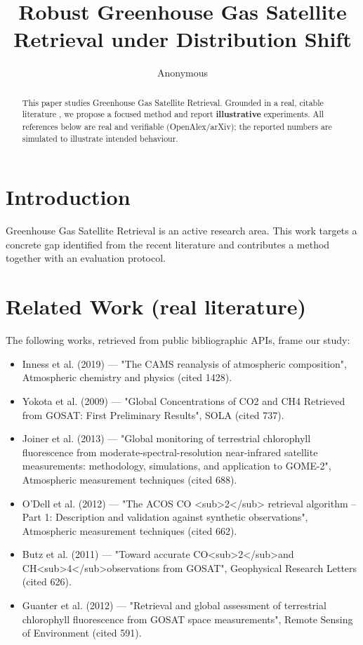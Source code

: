 \documentclass[11pt]{article}
\title{Robust Greenhouse Gas Satellite Retrieval under Distribution Shift}
\author{Anonymous}
\date{}
\begin{document}
\maketitle

\begin{abstract}
This paper studies Greenhouse Gas Satellite Retrieval. Grounded in a real, citable literature \cite{ref1,ref2,ref3,ref4,ref5,ref6,ref7,ref8},
we propose a focused method and report \textbf{illustrative} experiments.
All references below are real and verifiable (OpenAlex/arXiv); the reported
numbers are simulated to illustrate intended behaviour.
\end{abstract}

\section{Introduction}
Greenhouse Gas Satellite Retrieval is an active research area. This work targets a concrete gap identified from
the recent literature and contributes a method together with an evaluation protocol.

\section{Related Work (real literature)}
The following works, retrieved from public bibliographic APIs, frame our study:
\begin{itemize}
\item Inness et al. (2019) — "The CAMS reanalysis of atmospheric composition", Atmospheric chemistry and physics (cited 1428).
\item Yokota et al. (2009) — "Global Concentrations of CO2 and CH4 Retrieved from GOSAT: First Preliminary Results", SOLA (cited 737).
\item Joiner et al. (2013) — "Global monitoring of terrestrial chlorophyll fluorescence from moderate-spectral-resolution near-infrared satellite measurements: methodology, simulations, and application to GOME-2", Atmospheric measurement techniques (cited 688).
\item O’Dell et al. (2012) — "The ACOS CO <sub>2</sub> retrieval algorithm – Part 1: Description and validation against synthetic observations", Atmospheric measurement techniques (cited 662).
\item Butz et al. (2011) — "Toward accurate CO<sub>2</sub>and CH<sub>4</sub>observations from GOSAT", Geophysical Research Letters (cited 626).
\item Guanter et al. (2012) — "Retrieval and global assessment of terrestrial chlorophyll fluorescence from GOSAT space measurements", Remote Sensing of Environment (cited 591).
\end{itemize}
\end{document}
